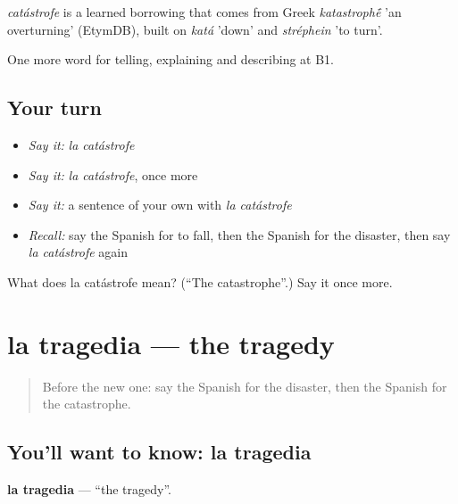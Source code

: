 \begin{cousinweb}
\emph{catástrofe} is a learned borrowing that comes from Greek \emph{katastroph\'{\={e}}} 'an overturning' (EtymDB), built on \emph{katá} 'down' and \emph{stréphein} 'to turn'.
\end{cousinweb}

\begin{grammarlens}[title={What you've built}]
One more word for telling, explaining and describing at B1.
\end{grammarlens}

\subsection*{Your turn}
\begin{itemize}
\raggedright
  \item \emph{Say it:} \emph{la catástrofe}
  \item \emph{Say it:} \emph{la catástrofe}, once more
  \item \emph{Say it:} a sentence of your own with \emph{la catástrofe}
  \item \emph{Recall:} say the Spanish for to fall, then the Spanish for the disaster, then say \emph{la catástrofe} again
\end{itemize}

\begin{tcolorbox}[breakable,colback=teal!4,colframe=teal!35!black,title={Before you move on}]
What does la catástrofe mean? (\textquotedblleft{}The catastrophe\textquotedblright{}.) Say it once more.
\end{tcolorbox}
\section[la tragedia]{la tragedia — the tragedy}

\label{lesson:ES-C528-tragedia}



\begin{quote}
Before the new one: say the Spanish for the disaster, then the Spanish for the catastrophe.
\end{quote}

\subsection*{You'll want to know: la tragedia}
\textbf{la tragedia} — \textquotedblleft{}the tragedy\textquotedblright{}.

